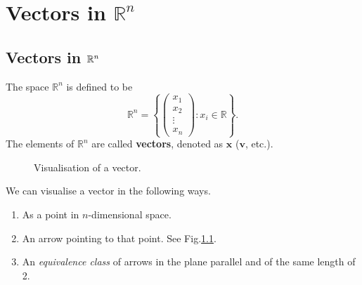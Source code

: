 \clearpage

\chapter{Vectors in $\mathbb R^n$}

\section{Vectors in $\mathbb{R}^n$}

\begin{definition}
    The space $\mathbb R^n$ is defined to be
    \[
        \mathbb R^n=
        \left\{
            \begin{pmatrix}
                x_1\\
                x_2\\
                \vdots\\
                x_n
            \end{pmatrix}
            : x_i \in \mathbb R
        \right\}    
        .
    \]
    The elements of $\mathbb R^n$ are called \textbf{vectors}, denoted as $\bm x$ ($\bm v$, etc.). 
\end{definition}


\begin{figure}
    \centering
    \caption{Visualisation of a vector.}
    \label{fig:vector_vis}
\end{figure}

We can visualise a vector in the following ways.

\begin{enumerate}
    \item As a point in $n$-dimensional space.
    \item An arrow pointing to that point. See Fig.\ref{fig:vector_vis}.
    \item An \emph{equivalence class} of arrows in the plane parallel and of the same length of 2.
\end{enumerate}

